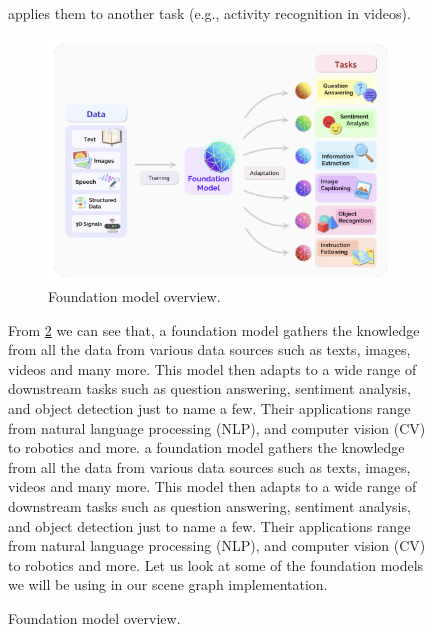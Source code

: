 \begin{figure}[ht!]
applies them to another task (e.g., activity recognition in videos). 
\begin{figure}[ht!]
    \centering
    \includegraphics[width=\textwidth]{images/FoundationModels.png}
    \caption{Foundation model overview.}
    \label{fig:foundation_model}
\end{figure}
From \cref{fig:foundation_model} we can see that, 
a foundation model gathers the knowledge from all the data from various data sources such as texts, images, videos and many more.
This model then adapts to a wide range of downstream tasks such as question answering, sentiment analysis, and object detection just to 
name a few. Their applications range from natural language processing (NLP), and computer vision (CV) to robotics and more. 
a foundation model gathers the knowledge from all the data from various data sources such as texts, images, videos and many more.
This model then adapts to a wide range of downstream tasks such as question answering, sentiment analysis, and object detection just to 
name a few. Their applications range from natural language processing (NLP), and computer vision (CV) to robotics and more. 
Let us look at some of the foundation models we will be using in our scene graph implementation.


\end{figure}
